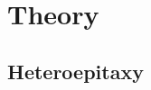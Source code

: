 \documentclass[12pt]{book}
\begin{document}
\chapter{Theory}

%
%     
    
%     
%         
%         

\section{Heteroepitaxy}
    

\newpage
\sloppy %
\printbibliography
\end{document}
